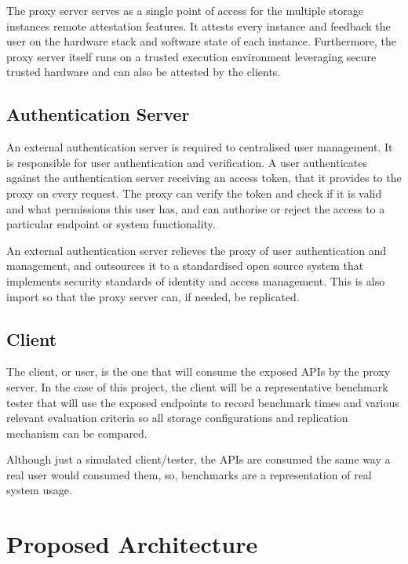 The proxy server serves as a single point of access for the multiple storage instances remote attestation features. It attests every instance and feedback the user on the hardware stack and software state of each instance. Furthermore, the proxy server itself runs on a trusted execution environment leveraging secure trusted hardware and can also be attested by the clients.

\subsection{Authentication Server}
\label{ssec:authentication_server}

An external authentication server is required to centralised user management. It is responsible for user authentication and verification. A user authenticates against the authentication server receiving an access token, that it provides to the proxy on every request. The proxy can verify the token and check if it is valid and what permissions this user has, and can authorise or reject the access to a particular endpoint or system functionality.

An external authentication server relieves the proxy of user authentication and management, and outsources it to a standardised open source system that implements security standards of identity and access management. This is also import so that the proxy server can, if needed, be replicated.

\subsection{Client}
\label{ssec:client}

The client, or user, is the one that will consume the exposed \glspl{API} by the proxy server. In the case of this project, the client will be a representative benchmark tester that will use the exposed endpoints to record benchmark times and various relevant evaluation criteria so all storage configurations and replication mechanism can be compared.

Although just a simulated client/tester, the \glspl{API} are consumed the same way a real user would consumed them, so, benchmarks are a representation of real system usage.

\section{Proposed Architecture} %
\label{sec:proposed_architecture}

